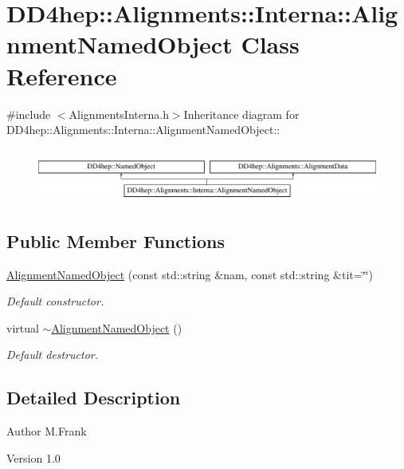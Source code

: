 \hypertarget{class_d_d4hep_1_1_alignments_1_1_interna_1_1_alignment_named_object}{
\section{DD4hep::Alignments::Interna::AlignmentNamedObject Class Reference}
\label{class_d_d4hep_1_1_alignments_1_1_interna_1_1_alignment_named_object}
}


{\ttfamily \#include $<$AlignmentsInterna.h$>$}Inheritance diagram for DD4hep::Alignments::Interna::AlignmentNamedObject::\begin{figure}[H]
\begin{center}
\leavevmode
\includegraphics[height=1.77778cm]{class_d_d4hep_1_1_alignments_1_1_interna_1_1_alignment_named_object}
\end{center}
\end{figure}
\subsection*{Public Member Functions}
\begin{DoxyCompactItemize}
\item 
\hyperlink{class_d_d4hep_1_1_alignments_1_1_interna_1_1_alignment_named_object_a0446fa258b55e441adae43fd5f1c20e8}{AlignmentNamedObject} (const std::string \&nam, const std::string \&tit=\char`\"{}\char`\"{})
\begin{DoxyCompactList}\small\item\em Default constructor. \item\end{DoxyCompactList}\item 
virtual \hyperlink{class_d_d4hep_1_1_alignments_1_1_interna_1_1_alignment_named_object_a96f03450aa9af33962d86b7067473939}{$\sim$AlignmentNamedObject} ()
\begin{DoxyCompactList}\small\item\em Default destructor. \item\end{DoxyCompactList}\end{DoxyCompactItemize}


\subsection{Detailed Description}
\begin{DoxyAuthor}{Author}
M.Frank 
\end{DoxyAuthor}
\begin{DoxyVersion}{Version}
1.0 
\end{DoxyVersion}


